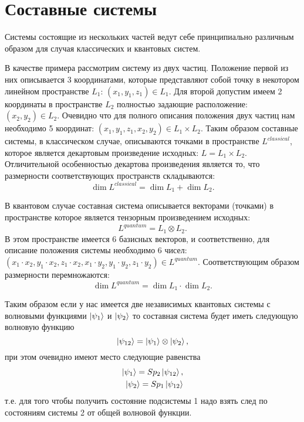 \section{Составные системы}
\label{sec:add:quantum:composite}
Системы состоящие из нескольких частей ведут себе принципиально
различным образом для случая классических и квантовых систем.


В качестве примера рассмотрим систему из двух частиц. Положение первой
из них описывается 3 координатами, которые представляют собой точку в
некотором линейном пространстве $L_1$: $(x_1, y_1, z_1) \in L_1$. Для второй
допустим имеем 2 координаты в пространстве $L_2$ полностью задающие
расположение:  
$(x_2, y_2) \in L_2$. Очевидно что для полного описания положения двух
частиц нам необходимо 5 координат: $(x_1, y_1, z_1, x_2, y_2) \in L_1
\times L_2$. Таким образом составные системы, в классическом случае,
описываются точками в пространстве $L^{classical}$, которое является декартовым
произведение исходных: $L = L_1 \times L_2$. Отличительной
особенностью декартова произведения является то, что размерности
соответствующих пространств складываются:
\[
\dim{L^{classical}} = \dim{L_1} + \dim{L_2}.
\] 

В квантовом случае составная система описывается векторами (точками) в
пространстве которое является тензорным произведением исходных: 
\[
L^{quantum} = L_1 \otimes L_2.
\]
В этом пространстве имеется 6 базисных векторов, и соответственно, для
описание положения системы необходимо 6 чисел:
$(x_1 \cdot x_2, y_1 \cdot x_2, z_1 \cdot x_2, 
x_1 \cdot y_2, y_1 \cdot y_2, z_1 \cdot y_2) \in L^{quantum}$. 
Соответствующим образом размерности перемножаются:
\[
\dim{L^{quantum}} = \dim{L_1} \cdot \dim{L_2}.
\] 

Таким образом если у нас имеется две независимых квантовых системы с
волновыми функциями $\ket{\psi_1}$ и $\ket{\psi_2}$ то составная
система будет иметь следующую волновую функцию
\[
\ket{\psi_{12}} = \ket{\psi_1} \otimes \ket{\psi_2},
\]
при этом очевидно имеют место следующие равенства 
\begin{eqnarray}
\ket{\psi_1} = Sp_2 \ket{\psi_{12}}, \\
\nonumber
\ket{\psi_2} = Sp_1 \ket{\psi_{12}} 
\nonumber
\end{eqnarray}
т.е. для того чтобы получить состояние подсистемы 1 надо взять след по
состояниям системы 2 от общей волновой функции. 


